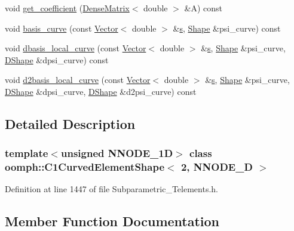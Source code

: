 \begin{DoxyCompactItemize}
\item 
void \hyperlink{classoomph_1_1C1CurvedElementShape_3_012_00_01NNODE__1D_01_4_a3029475256dcd92737fd5a3e01e5eb53}{get\+\_\+coefficient} (\hyperlink{classoomph_1_1DenseMatrix}{Dense\+Matrix}$<$ double $>$ \&A) const
\item 
void \hyperlink{classoomph_1_1C1CurvedElementShape_3_012_00_01NNODE__1D_01_4_ac1c436b2c6f49da2e0503ac4a746ba8b}{basis\+\_\+curve} (const \hyperlink{classoomph_1_1Vector}{Vector}$<$ double $>$ \&\hyperlink{cfortran_8h_ab7123126e4885ef647dd9c6e3807a21c}{s}, \hyperlink{classoomph_1_1Shape}{Shape} \&psi\+\_\+curve) const
\item 
void \hyperlink{classoomph_1_1C1CurvedElementShape_3_012_00_01NNODE__1D_01_4_ab40b2d47f321db5868443846290c2744}{dbasis\+\_\+local\+\_\+curve} (const \hyperlink{classoomph_1_1Vector}{Vector}$<$ double $>$ \&\hyperlink{cfortran_8h_ab7123126e4885ef647dd9c6e3807a21c}{s}, \hyperlink{classoomph_1_1Shape}{Shape} \&psi\+\_\+curve, \hyperlink{classoomph_1_1DShape}{D\+Shape} \&dpsi\+\_\+curve) const
\item 
void \hyperlink{classoomph_1_1C1CurvedElementShape_3_012_00_01NNODE__1D_01_4_a929507d3ddca39a6e27105b959853d84}{d2basis\+\_\+local\+\_\+curve} (const \hyperlink{classoomph_1_1Vector}{Vector}$<$ double $>$ \&\hyperlink{cfortran_8h_ab7123126e4885ef647dd9c6e3807a21c}{s}, \hyperlink{classoomph_1_1Shape}{Shape} \&psi\+\_\+curve, \hyperlink{classoomph_1_1DShape}{D\+Shape} \&dpsi\+\_\+curve, \hyperlink{classoomph_1_1DShape}{D\+Shape} \&d2psi\+\_\+curve) const
\end{DoxyCompactItemize}


\subsection{Detailed Description}
\subsubsection*{template$<$unsigned N\+N\+O\+D\+E\+\_\+1D$>$\newline
class oomph\+::\+C1\+Curved\+Element\+Shape$<$ 2, N\+N\+O\+D\+E\+\_\+D $>$}



Definition at line 1447 of file Subparametric\+\_\+\+Telements.\+h.



\subsection{Member Function Documentation}
\mbox{\label{classoomph_1_1C1CurvedElementShape_3_012_00_01NNODE__1D_01_4_ac1c436b2c6f49da2e0503ac4a746ba8b}} 

